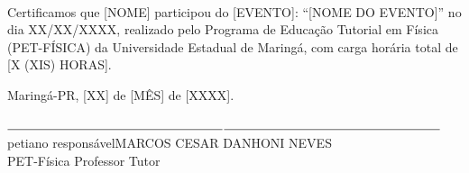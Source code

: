 \documentclass[12pt,a4paper]{memoir}
\begin{document}


\begin{center}
    \\[50pt]
\end{center}



    {\fontsize{19pt}{24pt} \selectfont Certificamos que [NOME] participou do [EVENTO]: “[NOME DO EVENTO]” no dia XX/XX/XXXX, realizado pelo Programa de Educação Tutorial em Física (PET-FÍSICA) da Universidade Estadual de Maringá, com carga horária total de [X (XIS) HORAS]. }\\[30pt]
    \begin{center}
    {\fontsize{19pt}{24pt} \selectfont Maringá-PR, [XX] de [MÊS] de [XXXX].}\\[220pt]
    \end{center}



\begin{flushleft}
$\rule{6cm}{0.15mm}$\hfill$\rule{6cm}{0.15mm}$\\

\footnotesize{\hspace{50px} petiano responsável\hfill MARCOS CESAR DANHONI NEVES\\
\hspace{60pt}PET-Física\hspace{185pt} Professor Tutor}
\end{flushleft}
\end{document}
